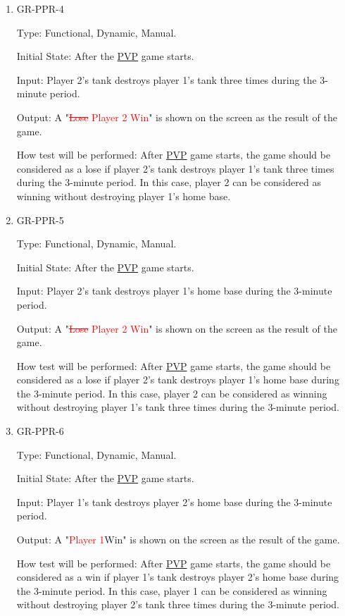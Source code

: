 \documentclass[12pt, titlepage]{article}
\begin{document}
\begin{enumerate}
\item{GR-PPR-4\\}

Type: Functional, Dynamic, Manual.
					
Initial State: After the \underline{PVP} game starts.
					
Input: Player 2's tank destroys player 1's tank three times during the 3-minute period.
					
Output: A "\textcolor{red}{\sout{Lose} Player 2 Win}" is shown on the screen as the result of the game.
					
How test will be performed: After \underline{PVP} game starts, the game should be considered as a lose if player 2's tank destroys player 1's tank three times during the 3-minute period. In this case, player 2 can be considered as winning without destroying player 1's home base.

\item{GR-PPR-5\\}

Type: Functional, Dynamic, Manual.
					
Initial State: After the \underline{PVP} game starts.
					
Input: Player 2's tank destroys player 1's home base during the 3-minute period.
					
Output: A "\textcolor{red}{\sout{Lose} Player 2 Win}" is shown on the screen as the result of the game.
					
How test will be performed: After \underline{PVP} game starts, the game should be considered as a lose if player 2's tank destroys player 1's home base during the 3-minute period. In this case, player 2 can be considered as winning without destroying player 1's tank three times during the 3-minute period.

\item{GR-PPR-6\\}

Type: Functional, Dynamic, Manual.
					
Initial State: After the \underline{PVP} game starts.
					
Input: Player 1's tank destroys player 2's home base during the 3-minute period.
					
Output: A "\textcolor{red}{Player 1}Win" is shown on the screen as the result of the game.
					
How test will be performed: After \underline{PVP} game starts, the game should be considered as a win if player 1's tank destroys player 2's home base during the 3-minute period. In this case, player 1 can be considered as winning without destroying player 2's tank three times during the 3-minute period.

\end{enumerate}
\end{document}
